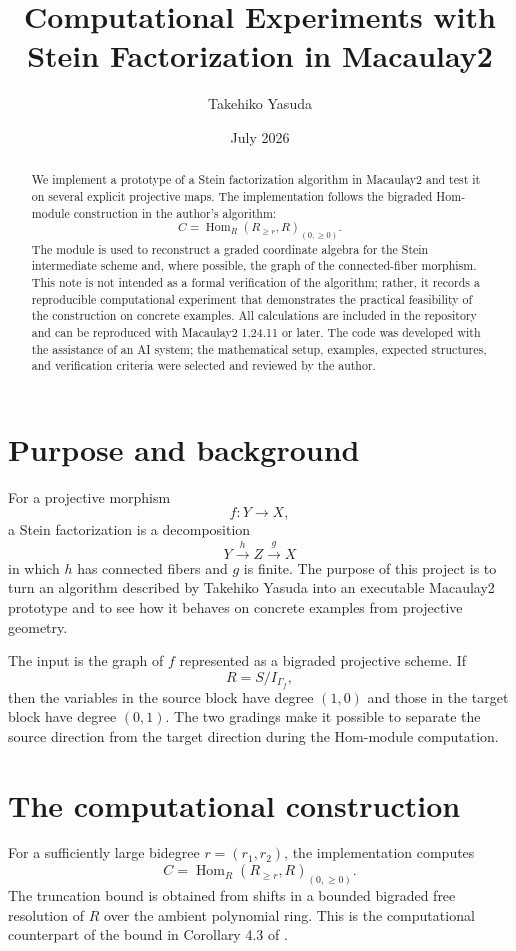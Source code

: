 \documentclass[a4paper,11pt]{article}
\title{Computational Experiments with Stein Factorization in Macaulay2}
\author{Takehiko Yasuda}
\date{July 2026}
\begin{document}
\maketitle

\begin{abstract}
We implement a prototype of a Stein factorization algorithm in Macaulay2 and test it on
several explicit projective maps. The implementation follows the bigraded Hom-module
construction in the author's algorithm:
\[
 C=\operatorname{Hom}_R(R_{\geq r},R)_{(0,\geq 0)}.
\]
The module is used to reconstruct a graded coordinate algebra for the Stein intermediate
scheme and, where possible, the graph of the connected-fiber morphism. This note is not
intended as a formal verification of the algorithm; rather, it records a reproducible
computational experiment that demonstrates the practical feasibility of the construction
on concrete examples. All calculations are included in the repository and can be reproduced
with Macaulay2 1.24.11 or later. The code was developed with the assistance of an AI
system; the mathematical setup, examples, expected structures, and verification criteria
were selected and reviewed by the author.
\end{abstract}

\section{Purpose and background}

For a projective morphism
\[
 f:Y\longrightarrow X,
\]
a Stein factorization is a decomposition
\[
 Y\xrightarrow{h} Z\xrightarrow{g} X
\]
in which $h$ has connected fibers and $g$ is finite. The purpose of this project is to
turn an algorithm described by Takehiko Yasuda\cite{yasuda} into an executable Macaulay2
prototype and to see how it behaves on concrete examples from projective geometry.

The input is the graph of $f$ represented as a bigraded projective scheme. If
\[
 R=S/I_{\Gamma_f},
\]
then the variables in the source block have degree $(1,0)$ and those in the target block
have degree $(0,1)$. The two gradings make it possible to separate the source direction
from the target direction during the Hom-module computation.

\section{The computational construction}

For a sufficiently large bidegree $r=(r_1,r_2)$, the implementation computes
\[
 C=\operatorname{Hom}_R(R_{\geq r},R)_{(0,\geq0)}.
\]
The truncation bound is obtained from shifts in a bounded bigraded free resolution of
$R$ over the ambient polynomial ring. This is the computational counterpart of the
bound in Corollary 4.3 of \cite{yasuda}.
\end{document}
